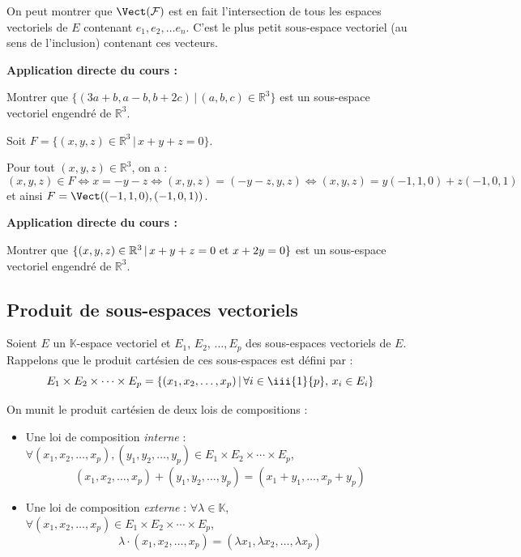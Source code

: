 \documentclass[french,11pt,twoside]{VcCours}
\newenvironment{ApplicationDirecte}{\textbf{Application directe du cours :}

}{}
\begin{document}
\begin{Remarque}{} On peut montrer que $\Vect(\mathcal{F})$ est en fait l'intersection de tous les espaces vectoriels de $E$ contenant $e_1, e_2, \ldots e_n$. C'est le plus petit sous-espace vectoriel (au sens de l'inclusion) contenant ces vecteurs.
\end{Remarque}

\medskip

\begin{ApplicationDirecte} Montrer que $\lbrace (3a+b,a-b,b+2c) \, \vert \, (a,b,c) \in \mathbb{R}^3 \rbrace$ est un sous-espace vectoriel engendré de $\mathbb{R}^3$.
\end{ApplicationDirecte}

\begin{Exemple} Soit $F = \lbrace (x,y,z) \in \mathbb{R}^3 \,  \vert \, x+y+z= 0 \rbrace.$ 

Pour tout $(x,y,z) \in \mathbb{R}^3$, on a :
$$ (x,y,z) \in F \Longleftrightarrow x=-y-z \Longleftrightarrow (x,y,z) = (-y-z,y,z) \Longleftrightarrow (x,y,z) = y(-1,1,0)+z(-1,0,1)$$
et ainsi $F = \Vect((-1,1,0), (-1,0,1))$.
\end{Exemple}

\begin{ApplicationDirecte} Montrer que $\lbrace (x,y,z)  \in \mathbb{R}^3 \, \vert \, x+y+z=0 \hbox{ et } x+2y=0\rbrace$ est un sous-espace vectoriel engendré de $\mathbb{R}^3$.
\end{ApplicationDirecte}

\subsection{Produit de sous-espaces vectoriels}

Soient $E$ un $\mathbb{K}$-espace vectoriel et $E_1$, $E_2$, $\ldots, E_p$ des sous-espaces vectoriels de $E$. Rappelons que le produit cartésien de ces sous-espaces est défini par :
$$ E_1 \times E_2 \times \cdots \times E_p = \left\lbrace (x_1, x_2, \ldots, x_p) \, \vert \, \forall i \in \iii{1}{p}, \, x_i \in E_i \right\rbrace$$

On munit le produit cartésien de deux lois de compositions :

\begin{itemize}
\item Une loi de composition \emph{interne} : $\forall (x_1, x_2, \ldots, x_p), (y_1, y_2, \ldots, y_p) \in E_1 \times E_2 \times \cdots \times E_p$,
$$ (x_1, x_2, \ldots, x_p) + (y_1, y_2, \ldots, y_p) = (x_1+y_1, \ldots, x_p + y_p)$$
\item Une loi de composition \emph{externe} : $\forall \lambda \in \mathbb{K}$, $\forall (x_1, x_2, \ldots, x_p) \in E_1 \times E_2 \times \cdots \times E_p$,
$$ \lambda \cdot (x_1, x_2, \ldots, x_p) = (\lambda x_1, \lambda x_2, \ldots, \lambda x_p)$$
\end{itemize}
\end{document}
